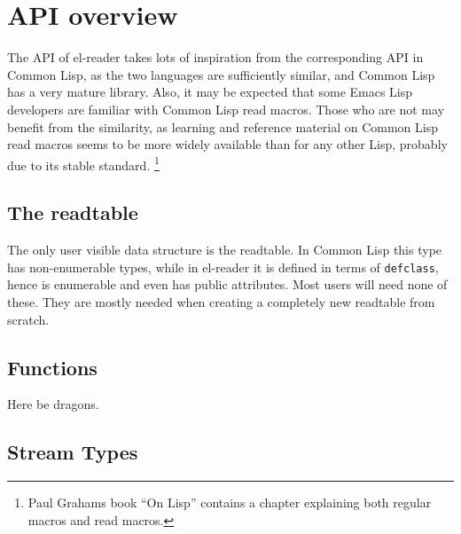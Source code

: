 \documentclass[a4paper,10pt,twoside]{report}
\newcommand{\el}{Emacs Lisp}
\newcommand{\cl}{Common Lisp}
\newcommand{\elr}{el-reader}
\newcommand{\fun}[1]{\texttt{#1}}
\begin{document}
\chapter{API overview}
\label{sec:api-overview}

The API of \elr{} takes lots of inspiration from the corresponding API in
\cl{}, as the two languages are sufficiently similar, and \cl{} has a very
mature library.  Also, it may be expected that some \el{} developers are
familiar with \cl{} read macros.  Those who are not may benefit from the
similarity, as learning and reference material on \cl{} read macros seems to be
more widely available than for any other Lisp, probably due to its stable
standard.  \footnote{Paul Grahams book ``On Lisp''\cite[p.~224]{on-lisp}
  contains a chapter explaining both regular macros and read macros.}

\section{The readtable}
\label{subsec:readtable}

The only user visible data structure is the readtable.  In \cl{} this type has
non-enumerable types, while in \elr{} it is defined in terms of
\fun{defclass}, hence is enumerable and even has public attributes.  Most users
will need none of these.  They are mostly needed when creating a completely new
readtable from scratch.

\section{Functions}
\label{subsec:functions}

Here be dragons.

\section{Stream Types}
\label{sec:stream-types}




\pagebreak


\end{document}
